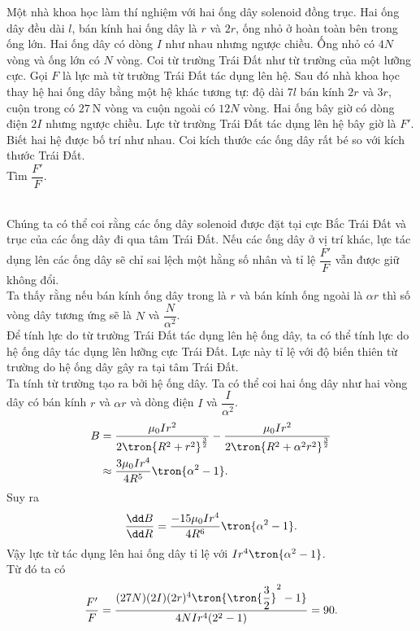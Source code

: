 \begin{vd}
     Một nhà khoa học làm thí nghiệm với hai ống dây solenoid đồng trục. Hai ống dây đều dài $l$, bán kính hai ống dây là $r$ và $2r$, ống nhỏ ở hoàn toàn bên trong ống lớn. Hai ống dây có dòng $I$ như nhau nhưng ngược chiều. Ống nhỏ có $4N$ vòng và ống lớn có $N$ vòng. Coi từ trường Trái Đất như từ trường của một lưỡng cực. Gọi $F$ là lực mà từ trường Trái Đất tác dụng lên hệ. Sau đó nhà khoa học thay hệ hai ống dây bằng một hệ khác tương tự: độ dài $7l$ bán kính $2r$ và $3r$, cuộn trong có $27~\mathrm{N}$ vòng va cuộn ngoài có $12N$ vòng. Hai ống bây giờ có dòng điện $2I$ nhưng ngược chiều. Lực từ trường Trái Đất tác dụng lên hệ bây giờ là $F'$. Biết hai hệ được bố trí như nhau. Coi kích thước các ống dây rất bé so với kích thước Trái Đất. \\
     Tìm $\displaystyle \dfrac{F'}{F}$.
\end{vd}
\begin{loigiai}\\
Chúng ta có thể coi rằng các ống dây solenoid được đặt tại cực Bắc Trái Đất và trục của các ống dây đi qua tâm Trái Đất. Nếu các ống dây ở vị trí khác, lực tác dụng lên các ống dây sẽ chỉ sai lệch một hằng số nhân và tỉ lệ $\dfrac{F'}{F}$ vẫn được giữ không đổi.\\
Ta thấy rằng nếu bán kính ống dây trong là $r$ và bán kính ống ngoài là $\alpha r$ thì số vòng dây tương ứng sẽ là $N$ và $\dfrac{N}{\alpha^2}$.\\
Để tính lực do từ trường Trái Đất tác dụng lên hệ ống dây, ta có thể tính lực do hệ ống dây tác dụng lên lưỡng cực Trái Đất. Lực này tỉ lệ với độ biến thiên từ trường do hệ ống dây gây ra tại tâm Trái Đất.\\ 
Ta tính từ trường tạo ra bởi hệ ống dây. Ta có thể coi hai ống dây như hai vòng dây có bán kính $r$ và $\alpha r$ và dòng điện $I$ và $\dfrac{I}{\alpha^2}$.
\begin{equation*}
    \begin{aligned}
     B&=\dfrac{\mu_0Ir^2}{2\tron{R^2+r^2}^{\frac{3}{2}}}-\dfrac{\mu_0Ir^2}{2\tron{R^2+\alpha^2r^2}^{\frac{3}{2}}}\\
     &\approx\dfrac{3\mu_0Ir^4}{4R^5}\tron{\alpha^2-1}.
    \end{aligned}
\end{equation*}
Suy ra $$\dfrac{\dd B}{\dd R}=\dfrac{-15\mu_0Ir^4}{4R^6}\tron{\alpha^2-1} .$$
Vậy lực từ tác dụng lên hai ống dây tỉ lệ với $Ir^4\tron{\alpha^2-1}$.\\
Từ đó ta có $$\frac{F'}{F}=\dfrac{(27N)(2I)(2r)^4\tron{\tron{\dfrac{3}{2}}^2-1}}{4NIr^4(2^2-1)}=90.$$
\end{loigiai}

